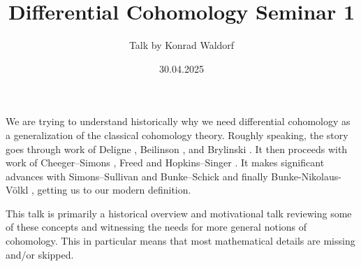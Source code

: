 \documentclass[10pt]{amsart}
\title{Differential Cohomology Seminar 1}
\date{30.04.2025}
\author{Talk by Konrad	Waldorf}
\begin{document}
\maketitle


We are trying to understand historically why we need differential cohomology as a generalization of the classical cohomology theory.
Roughly speaking, the story goes through work of Deligne \cite{deligne1971mixedhodge}, Beilinson \cite{beilinson1984regulators}, and Brylinski  \cite{brylinski1993geomquant}. It then proceeds with work of Cheeger--Simons \cite{cheegersimons1985diffchar}, Freed \cite{freed2000diffcoh} and Hopkins--Singer \cite{hopkinssinger2005diffcoh}. It makes significant advances with Simons--Sullivan \cite{simonssullivan2008diffcoh} and Bunke--Schick \cite{bunkeschick2009smoothk} and finally Bunke-Nikolaus-V{\"o}lkl \cite{bunkenikolausvoelkl2016diffcoh}, getting us to our modern definition. 

This talk is primarily a historical overview and motivational talk reviewing some of these concepts and witnessing the needs for more general notions of cohomology. This in particular means that most mathematical details are missing and/or skipped.
\end{document}
